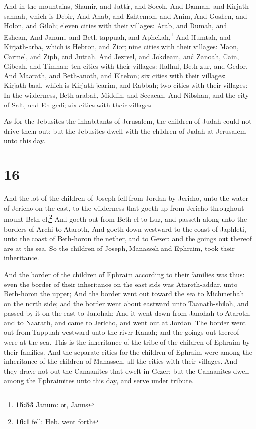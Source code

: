  And in the mountains, Shamir, and Jattir, and Socoh,
 And Dannah, and Kirjath-sannah, which is Debir,
 And Anab, and Eshtemoh, and Anim,  And
Goshen, and Holon, and Giloh; eleven cities with their villages:
 Arab, and Dumah, and Eshean,  And Janum,
and Beth-tappuah, and Aphekah,\footnote{\textbf{15:53} Janum: or, Janus}
 And Humtah, and Kirjath-arba, which is Hebron, and Zior;
nine cities with their villages:  Maon, Carmel, and Ziph,
and Juttah,  And Jezreel, and Jokdeam, and Zanoah,
 Cain, Gibeah, and Timnah; ten cities with their
villages:  Halhul, Beth-zur, and Gedor, 
And Maarath, and Beth-anoth, and Eltekon; six cities with their
villages:  Kirjath-baal, which is Kirjath-jearim, and
Rabbah; two cities with their villages:  In the
wilderness, Beth-arabah, Middin, and Secacah,  And
Nibshan, and the city of Salt, and En-gedi; six cities with their
villages.

 As for the Jebusites the inhabitants of Jerusalem, the
children of Judah could not drive them out: but the Jebusites dwell with
the children of Judah at Jerusalem unto this day.

\hypertarget{section-15}{%
\section{16}\label{section-15}}

 And the lot of the children of Joseph fell from Jordan by
Jericho, unto the water of Jericho on the east, to the wilderness that
goeth up from Jericho throughout mount Beth-el,\footnote{\textbf{16:1}
  fell: Heb. went forth}  And goeth out from Beth-el to
Luz, and passeth along unto the borders of Archi to Ataroth,
 And goeth down westward to the coast of Japhleti, unto
the coast of Beth-horon the nether, and to Gezer: and the goings out
thereof are at the sea.  So the children of Joseph,
Manasseh and Ephraim, took their inheritance.

 And the border of the children of Ephraim according to
their families was thus: even the border of their inheritance on the
east side was Ataroth-addar, unto Beth-horon the upper; 
And the border went out toward the sea to Michmethah on the north side;
and the border went about eastward unto Taanath-shiloh, and passed by it
on the east to Janohah;  And it went down from Janohah to
Ataroth, and to Naarath, and came to Jericho, and went out at Jordan.
 The border went out from Tappuah westward unto the river
Kanah; and the goings out thereof were at the sea. This is the
inheritance of the tribe of the children of Ephraim by their families.
 And the separate cities for the children of Ephraim were
among the inheritance of the children of Manasseh, all the cities with
their villages.  And they drave not out the Canaanites
that dwelt in Gezer: but the Canaanites dwell among the Ephraimites unto
this day, and serve under tribute.

